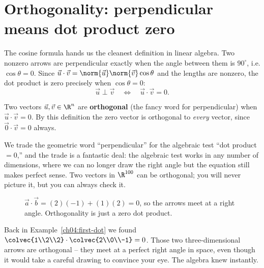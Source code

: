 \section{Orthogonality: perpendicular means dot product zero}

The cosine formula hands us the cleanest definition in linear algebra. Two nonzero
arrows are perpendicular exactly when the angle between them is $90^\circ$, i.e.
$\cos\theta = 0$. Since $\vec u\cdot\vec v = \norm{\vec u}\norm{\vec v}\cos\theta$
and the lengths are nonzero, the dot product is zero precisely when $\cos\theta = 0$:
\[
  \vec u \perp \vec v \quad\Longleftrightarrow\quad \vec u\cdot\vec v = 0.
\]

\begin{definition}\label{ch04:orthogonal}
Two vectors $\vec u, \vec v\in\R^n$ are \textbf{orthogonal} (the fancy word for
perpendicular) when $\vec u\cdot\vec v = 0$. By this definition the zero vector is
orthogonal to \emph{every} vector, since $\vec 0\cdot\vec v = 0$ always.
\end{definition}

We trade the geometric word ``perpendicular'' for the algebraic test ``dot product
$=0$,'' and the trade is a fantastic deal: the algebraic test works in any number
of dimensions, where we can no longer draw the right angle but the equation still
makes perfect sense. Two vectors in $\R^{100}$ can be orthogonal; you will never
picture it, but you can always check it.

\begin{figure}[H]
\centering
{}
\caption{$\vec a\cdot\vec b = (2)(-1)+(1)(2) = 0$, so the arrows meet at a right
angle. Orthogonality is just a zero dot product.}
\label{ch04:perp}
\end{figure}

\begin{example}
Back in Example~\ref{ch04:first-dot} we found
$\colvec{1\\2\\2}\cdot\colvec{2\\0\\-1}=0$. Those two three-dimensional arrows are
orthogonal -- they meet at a perfect right angle in space, even though it would take
a careful drawing to convince your eye. The algebra knew instantly.
\end{example}

